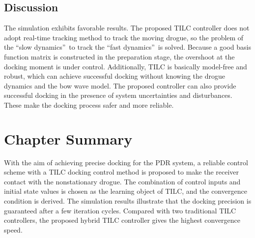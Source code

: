 \subsection{Discussion}

The simulation exhibits favorable results. The proposed TILC controller does
not adopt real-time tracking method to track the moving drogue, so the problem
of the \textquotedblleft slow dynamics\textquotedblright \ to track the
\textquotedblleft fast dynamics\textquotedblright \ is solved. Because a good
basis function matrix is constructed in the preparation stage, the overshoot
at the docking moment is under control. Additionally, TILC is basically
model-free and robust, which can achieve successful docking without knowing
the drogue dynamics and the bow wave model. The proposed controller can also
provide successful docking in the presence of system uncertainties and
disturbances. These make the docking process safer and more reliable.

\section{Chapter Summary}

\label{Conclusions}

With the aim of achieving precise docking for the PDR system, a reliable
control scheme with a TILC docking control method is proposed to make the
receiver contact with the nonstationary drogue. The combination of control
inputs and initial state values is chosen as the learning object of TILC, and
the convergence condition is derived. The simulation results illustrate that
the docking precision is guaranteed after a few iteration cycles. Compared
with two traditional TILC controllers, the proposed hybrid TILC controller
gives the highest convergence speed.